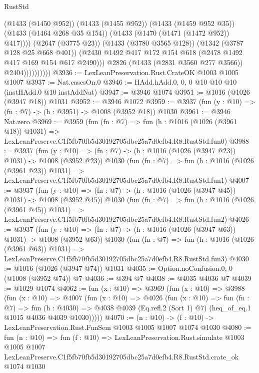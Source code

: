 \begin{lexlean}{RustStd}
\begin{coremodule}
                              (@1433 (@1450 @952))
                              (@1433 (@1455 @952))
                              (@1433 (@1459 @952 @35))
                              (@1433 (@1464 @268 @35 @154))
                              (@1433 (@1470 (@1471 (@1472 @952)) @417))))
                          (@2647 (@3775 @23))
                          (@1433 (@3780 @3565 @128))
                          (@1342 (@3787 @128 @25 @668 @401))
                          (@2430 @1492 @417 @172 @154 @618 (@2478 @1492 @417 @169 @154 @617 @2490)))
                        @2826
                        (@1433 (@2831 @3560 @277 @3566))
                        @2404))))))))))
@3936 := LexLeanPreservation.Rust.CrateOK @1003 @1005 @1007
@3937 := Nat.casesOn.{0}
@3946 := HAdd.hAdd.{0, 0, 0} @10 @10 @10 (instHAdd.{0} @10 instAddNat)
@3947 := @3946 @1074
@3951 := @1016 (@1026 (@3947 @18)) @1031
@3952 := @3946 @1072
@3959 := @3937 (fun (y : @10) => (fn : @7) -> (h : @3951) -> @1008 (@3952 @18)) @1030
@3961 := @3946 Nat.zero
@3969 := @3959
    (fun (fn : @7) =>
    fun (h : @1016 (@1026 (@3961 @18)) @1031) =>
    LexLeanPreserve.C1f5fb70fb5d30192705dbc25a7d0efb4.R8.RustStd.fun0)
@3988 := @3937
    (fun (y : @10) => (fn : @7) -> (h : @1016 (@1026 (@3947 @23)) @1031) -> @1008 (@3952 @23))
    @1030
    (fun (fn : @7) =>
    fun (h : @1016 (@1026 (@3961 @23)) @1031) =>
    LexLeanPreserve.C1f5fb70fb5d30192705dbc25a7d0efb4.R8.RustStd.fun1)
@4007 := @3937
    (fun (y : @10) => (fn : @7) -> (h : @1016 (@1026 (@3947 @45)) @1031) -> @1008 (@3952 @45))
    @1030
    (fun (fn : @7) =>
    fun (h : @1016 (@1026 (@3961 @45)) @1031) =>
    LexLeanPreserve.C1f5fb70fb5d30192705dbc25a7d0efb4.R8.RustStd.fun2)
@4026 := @3937
    (fun (y : @10) => (fn : @7) -> (h : @1016 (@1026 (@3947 @63)) @1031) -> @1008 (@3952 @63))
    @1030
    (fun (fn : @7) =>
    fun (h : @1016 (@1026 (@3961 @63)) @1031) =>
    LexLeanPreserve.C1f5fb70fb5d30192705dbc25a7d0efb4.R8.RustStd.fun3)
@4030 := @1016 (@1026 (@3947 @74)) @1031
@4035 := Option.noConfusion.{0, 0} (@1008 (@3952 @74)) @7
@4036 := @394 @7
@4038 := @4035 @4036 @7
@4039 := @1029 @1074
@4062 := fun (x : @10) =>
  @3969
    (fun (x : @10) =>
    @3988
      (fun (x : @10) =>
      @4007
        (fun (x : @10) =>
        @4026
          (fun (x : @10) =>
          fun (fn : @7) =>
          fun (h : @4030) =>
          @4038 @4039 (Eq.refl.{2} (Sort 1) @7) (heq_of_eq.{1} @1015 @4036 @4039 @1030)))))
@4070 := (n : @10) -> (f : @10) -> LexLeanPreservation.Rust.FunSem @1003 @1005 @1007 @1074 @1030
@4080 := fun (n : @10) =>
  fun (f : @10) =>
  LexLeanPreservation.Rust.simulate
    @1003
    @1005
    @1007
    LexLeanPreserve.C1f5fb70fb5d30192705dbc25a7d0efb4.R8.RustStd.crate_ok
    @1074
    @1030
\end{coremodule}
\end{lexlean}

